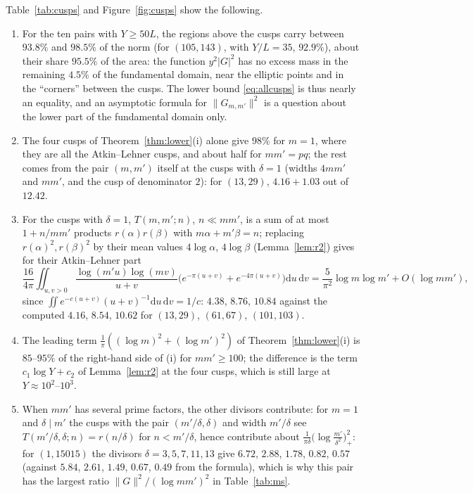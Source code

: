 ﻿\documentclass[11pt]{amsart}
\theoremstyle{remark}
\newcommand{\dd}{\mathrm{d}}
\begin{document}
Table~\ref{tab:cusps} and Figure~\ref{fig:cusps} show the following.
\begin{enumerate}[label=(\alph*),leftmargin=2.2em]
\item For the ten pairs with $Y\ge50L$, the regions above the cusps carry between $93.8\%$ and $98.5\%$ of the norm (for $(105,143)$, with $Y/L=35$, $92.9\%$), about their share $95.5\%$ of the area: the function $y^2|G|^2$ has no excess mass in the remaining $4.5\%$ of the fundamental domain, near the elliptic points and in the ``corners'' between the cusps. The lower bound \eqref{eq:allcusps} is thus nearly an equality, and an asymptotic formula for $\|G_{m,m'}\|^2$ is a question about the lower part of the fundamental domain only.
\item The four cusps of Theorem~\ref{thm:lower}(i) alone give $98\%$ for $m=1$, where they are all the Atkin--Lehner cusps, and about half for $mm'=pq$; the rest comes from the pair $(m,m')$ itself at the cusps with $\delta=1$ (widths $4mm'$ and $mm'$, and the cusp of denominator $2$): for $(13,29)$, $4.16+1.03$ out of $12.42$.
\item For the cusps with $\delta=1$, $T(m,m';n)$, $n\ll mm'$, is a sum of at most $1+n/mm'$ products $r(\alpha)r(\beta)$ with $m\alpha+m'\beta=n$; replacing $r(\alpha)^2,r(\beta)^2$ by their mean values $4\log\alpha$, $4\log\beta$ (Lemma~\ref{lem:r2}) gives for their Atkin--Lehner part
\[
\frac{16}{4\pi}\iint_{u,v>0}\frac{\log(m'u)\log(mv)}{u+v}\bigl(e^{-\pi(u+v)}+e^{-4\pi(u+v)}\bigr)\dd u\,\dd v=\frac5{\pi^2}\log m\log m'+O(\log mm'),
\]
since $\iint e^{-c(u+v)}(u+v)^{-1}\dd u\,\dd v=1/c$: $4.38$, $8.76$, $10.84$ against the computed $4.16$, $8.54$, $10.62$ for $(13,29)$, $(61,67)$, $(101,103)$.
\item The leading term $\frac1\pi((\log m)^2+(\log m')^2)$ of Theorem~\ref{thm:lower}(i) is $85$--$95\%$ of the right-hand side of (i) for $mm'\ge100$; the difference is the term $c_1\log Y+c_2$ of Lemma~\ref{lem:r2} at the four cusps, which is still large at $Y\approx10^2$--$10^3$.
\item When $mm'$ has several prime factors, the other divisors contribute: for $m=1$ and $\delta\mid m'$ the cusps with the pair $(m'/\delta,\delta)$ and width $m'/\delta$ see $T(m'/\delta,\delta;n)=r(n/\delta)$ for $n<m'/\delta$, hence contribute about $\frac1{\pi\delta}\bigl(\log\frac{m'}{\delta^2}\bigr)_+^2$: for $(1,15015)$ the divisors $\delta=3,5,7,11,13$ give $6.72$, $2.88$, $1.78$, $0.82$, $0.57$ (against $5.84$, $2.61$, $1.49$, $0.67$, $0.49$ from the formula), which is why this pair has the largest ratio $\|G\|^2/(\log mm')^2$ in Table~\ref{tab:ms}.

\end{enumerate}
\end{document}
